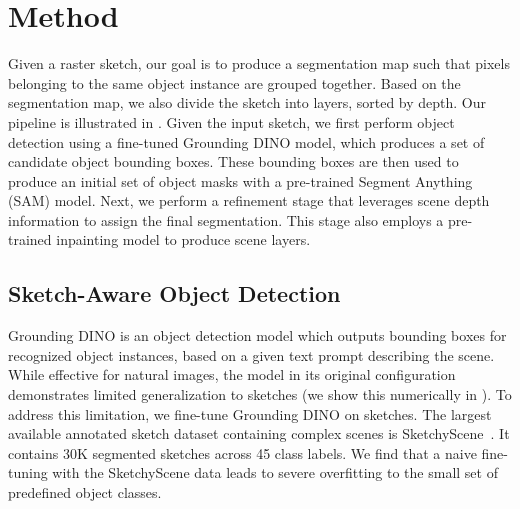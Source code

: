 \section{Method}
Given a raster sketch, our goal is to produce a segmentation map such that pixels belonging to the same object instance are grouped together. Based on the segmentation map, we also divide the sketch into layers, sorted by depth. Our pipeline is illustrated in . Given the input sketch, we first perform object detection using a fine-tuned Grounding DINO model, which produces a set of candidate object bounding boxes. These bounding boxes are then used to produce an initial set of object masks with a pre-trained Segment Anything (SAM) \cite{kirillov2023segany} model. Next, we perform a refinement stage that leverages scene depth information to assign the final segmentation. This stage also employs a pre-trained inpainting model \cite{von-platen-etal-2022-diffusers} to produce scene layers. 


\subsection{Sketch-Aware Object Detection}
Grounding DINO \cite{liu2023grounding} is an object detection model which outputs bounding boxes for recognized object instances, based on a given text prompt describing the scene. While effective for natural images, the model in its original configuration demonstrates limited generalization to sketches (we show this numerically in ). 
To address this limitation, we fine-tune Grounding DINO on sketches.  
The largest available annotated sketch dataset containing complex scenes is SketchyScene~\cite{Zou18SketchyScene}. It contains 30K segmented sketches across 45 class labels.
We find that a naive fine-tuning with the SketchyScene data leads to severe overfitting to the small set of predefined object classes.

